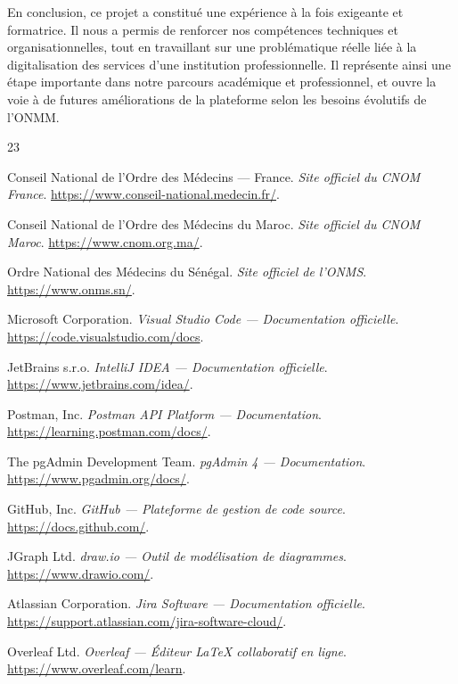 ﻿\documentclass[12pt,a4paper]{report}
\begin{document}
En conclusion, ce projet a constitué une expérience à la fois exigeante et formatrice. Il nous a permis de renforcer nos compétences techniques et organisationnelles, tout en travaillant sur une problématique réelle liée à la digitalisation des services d’une institution professionnelle. Il représente ainsi une étape importante dans notre parcours académique et professionnel, et ouvre la voie à de futures améliorations de la plateforme selon les besoins évolutifs de l’ONMM.
\renewcommand{\bibname}{Références}
\begin{thebibliography}{23}

Conseil National de l'Ordre des Médecins --- France.
\textit{Site officiel du CNOM France}.
\url{https://www.conseil-national.medecin.fr/}.

Conseil National de l'Ordre des Médecins du Maroc.
\textit{Site officiel du CNOM Maroc}.
\url{https://www.cnom.org.ma/}.

Ordre National des Médecins du Sénégal.
\textit{Site officiel de l'ONMS}.
\url{https://www.onms.sn/}.

Microsoft Corporation.
\textit{Visual Studio Code --- Documentation officielle}.
\url{https://code.visualstudio.com/docs}.

JetBrains s.r.o.
\textit{IntelliJ IDEA --- Documentation officielle}.
\url{https://www.jetbrains.com/idea/}.

Postman, Inc.
\textit{Postman API Platform --- Documentation}.
\url{https://learning.postman.com/docs/}.

The pgAdmin Development Team.
\textit{pgAdmin 4 --- Documentation}.
\url{https://www.pgadmin.org/docs/}.

GitHub, Inc.
\textit{GitHub --- Plateforme de gestion de code source}.
\url{https://docs.github.com/}.

JGraph Ltd.
\textit{draw.io --- Outil de modélisation de diagrammes}.
\url{https://www.drawio.com/}.

Atlassian Corporation.
\textit{Jira Software --- Documentation officielle}.
\url{https://support.atlassian.com/jira-software-cloud/}.

Overleaf Ltd.
\textit{Overleaf --- Éditeur LaTeX collaboratif en ligne}.
\url{https://www.overleaf.com/learn}.


\end{thebibliography}
\end{document}

